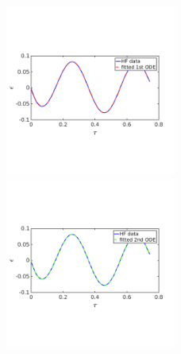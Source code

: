 \documentclass[10pt,xcolor=dvipsnames,compress]{beamer}
\begin{document}
\begin{frame}
\begin{figure}
\includegraphics[trim = 0.in  2.3in 0.in 2.8in, clip, width=0.5\textwidth]{figs/Isin_low_fitmodel_1st.png}
~
\includegraphics[trim = 0.in  2.3in 0.in 2.8in, clip, width=0.5\textwidth]{figs/Isin_low_fitmodel_2nd.png}
\end{figure}


\vfill
\end{frame}
\end{document}
